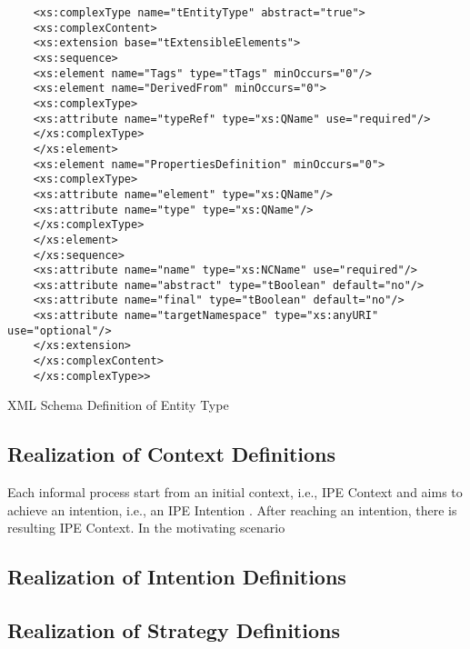 \begin{Listing}
	\begin{lstlisting}
	<xs:complexType name="tEntityType" abstract="true">
	<xs:complexContent>
	<xs:extension base="tExtensibleElements">
	<xs:sequence>
	<xs:element name="Tags" type="tTags" minOccurs="0"/>
	<xs:element name="DerivedFrom" minOccurs="0">
	<xs:complexType>
	<xs:attribute name="typeRef" type="xs:QName" use="required"/>
	</xs:complexType>
	</xs:element>
	<xs:element name="PropertiesDefinition" minOccurs="0">
	<xs:complexType>
	<xs:attribute name="element" type="xs:QName"/>
	<xs:attribute name="type" type="xs:QName"/>
	</xs:complexType>
	</xs:element>
	</xs:sequence>
	<xs:attribute name="name" type="xs:NCName" use="required"/>
	<xs:attribute name="abstract" type="tBoolean" default="no"/>
	<xs:attribute name="final" type="tBoolean" default="no"/>
	<xs:attribute name="targetNamespace" type="xs:anyURI" use="optional"/>
	</xs:extension>
	</xs:complexContent>
	</xs:complexType>>
	\end{lstlisting}
	\caption{XML Schema Definition of Entity Type}
	\label{lst:xsdlist}
\end{Listing}

\subsection{Realization of Context Definitions}
Each informal process start from an initial context, i.e., IPE Context and aims to achieve an intention, i.e., an IPE Intention \cite{Sungur2014a}. After reaching an intention, there is resulting IPE Context. In the motivating scenario  

\subsection{Realization of Intention Definitions}


\subsection{Realization of Strategy Definitions}

